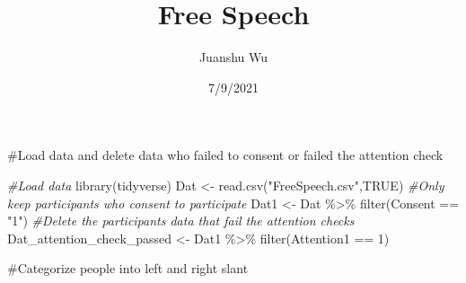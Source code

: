 \documentclass[
]{article}
\title{Free Speech}
\author{Juanshu Wu}
\date{7/9/2021}
\newenvironment{Shaded}{\begin{snugshade}}{\end{snugshade}}
\newcommand{\AttributeTok}[1]{\textcolor[rgb]{0.77,0.63,0.00}{#1}}
\newcommand{\CommentTok}[1]{\textcolor[rgb]{0.56,0.35,0.01}{\textit{#1}}}
\newcommand{\ConstantTok}[1]{\textcolor[rgb]{0.00,0.00,0.00}{#1}}
\newcommand{\DecValTok}[1]{\textcolor[rgb]{0.00,0.00,0.81}{#1}}
\newcommand{\FunctionTok}[1]{\textcolor[rgb]{0.00,0.00,0.00}{#1}}
\newcommand{\NormalTok}[1]{#1}
\newcommand{\OtherTok}[1]{\textcolor[rgb]{0.56,0.35,0.01}{#1}}
\newcommand{\SpecialCharTok}[1]{\textcolor[rgb]{0.00,0.00,0.00}{#1}}
\newcommand{\StringTok}[1]{\textcolor[rgb]{0.31,0.60,0.02}{#1}}
\begin{document}
\maketitle

\#Load data and delete data who failed to consent or failed the
attention check

\begin{Shaded}
\begin{Highlighting}[]
\CommentTok{\#Load data}
\FunctionTok{library}\NormalTok{(tidyverse)}
\NormalTok{Dat }\OtherTok{\textless{}{-}} \FunctionTok{read.csv}\NormalTok{(}\StringTok{"FreeSpeech.csv"}\NormalTok{,}\ConstantTok{TRUE}\NormalTok{)}
\CommentTok{\#Only keep participants who consent to participate}
\NormalTok{Dat1 }\OtherTok{\textless{}{-}}\NormalTok{ Dat }\SpecialCharTok{\%\textgreater{}\%} \FunctionTok{filter}\NormalTok{(Consent }\SpecialCharTok{==} \StringTok{"1"}\NormalTok{) }
\CommentTok{\#Delete the participants\textquotesingle{} data that fail the attention checks}
\NormalTok{Dat\_attention\_check\_passed }\OtherTok{\textless{}{-}}\NormalTok{ Dat1 }\SpecialCharTok{\%\textgreater{}\%} \FunctionTok{filter}\NormalTok{(Attention1 }\SpecialCharTok{==} \DecValTok{1}\NormalTok{)}
\end{Highlighting}
\end{Shaded}

\#Categorize people into left and right slant

\begin{Shaded}
\end{Shaded}
\end{document}
